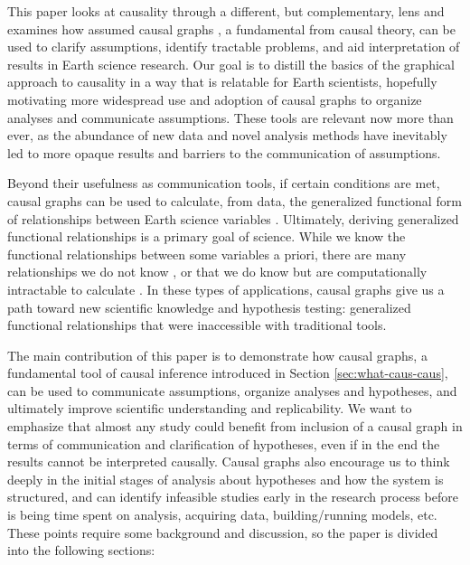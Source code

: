 \documentclass[12pt]{article}
\begin{document}
This paper looks at causality through a different, but complementary,
lens and examines how assumed causal graphs \citep{pearl1995causal}, a
fundamental from causal theory, can be used to clarify assumptions,
identify tractable problems, and aid interpretation of results in
Earth science research. Our goal is to distill the basics of the
graphical approach to causality \citep{olah2017} in a way that is
relatable for Earth scientists, hopefully motivating more widespread
use and adoption of causal graphs to organize analyses and communicate
assumptions. These tools are relevant now more than ever, as the
abundance of new data and novel analysis methods have inevitably led
to more opaque results and barriers to the communication of
assumptions.

Beyond their usefulness as communication tools, if certain conditions
are met, causal graphs can be used to calculate, from data, the
generalized functional form of relationships between Earth science
variables \citep{pearl2009causality}. Ultimately, deriving generalized
functional relationships is a primary goal of science. While we know
the functional relationships between some variables a priori, there
are many relationships we do not know \citep[e.g., ecosystem scale
water and carbon fluxes;][]{massmann2019, zhou2019arid,
  zhou2019feedback, grossiord2020}, or that we do know but are
computationally intractable to calculate \citep[e.g., clouds and
microphysics at the global scale:][]{randall2003, gentine2018,
  zadra2018, gagne2020emulation}. In these types of applications,
causal graphs give us a path toward new scientific knowledge and
hypothesis testing: generalized functional relationships that were
inaccessible with traditional tools.

The main contribution of this paper is to demonstrate how causal
graphs, a fundamental tool of causal inference introduced in Section
\ref{sec:what-caus-caus}, can be used to communicate assumptions,
organize analyses and hypotheses, and ultimately improve scientific understanding and replicability. We
want to emphasize that almost any study could benefit from inclusion
of a causal graph in terms of communication and clarification of hypotheses, even if
in the end the results cannot be interpreted causally. Causal graphs
also encourage us to think deeply in the initial stages of analysis
about hypotheses and how the system is structured, and can
identify infeasible studies early in the research process before is being time
spent on analysis, acquiring data, building/running models,
etc. These points require some background and discussion, so the
paper is divided into the following sections:
\end{document}

